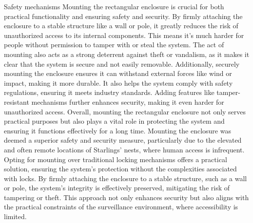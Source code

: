 \documentclass[class=report,11pt,crop=false]{standalone}
\begin{document}
Safety mechanisms
Mounting the rectangular enclosure is crucial for both practical functionality and ensuring safety and security. By firmly attaching the enclosure to a stable structure like a wall or pole, it greatly reduces the risk of unauthorized access to its internal components. This means it's much harder for people without permission to tamper with or steal the system. The act of mounting also acts as a strong deterrent against theft or vandalism, as it makes it clear that the system is secure and not easily removable. Additionally, securely mounting the enclosure ensures it can withstand external forces like wind or impact, making it more durable. It also helps the system comply with safety regulations, ensuring it meets industry standards. Adding features like tamper-resistant mechanisms further enhances security, making it even harder for unauthorized access. Overall, mounting the rectangular enclosure not only serves practical purposes but also plays a vital role in protecting the system and ensuring it functions effectively for a long time.
Mounting the enclosure was deemed a superior safety and security measure, particularly due to the elevated and often remote locations of Starlings' nests, where human access is infrequent. Opting for mounting over traditional locking mechanisms offers a practical solution, ensuring the system's protection without the complexities associated with locks. By firmly attaching the enclosure to a stable structure, such as a wall or pole, the system's integrity is effectively preserved, mitigating the risk of tampering or theft. This approach not only enhances security but also aligns with the practical constraints of the surveillance environment, where accessibility is limited.
\end{document}

